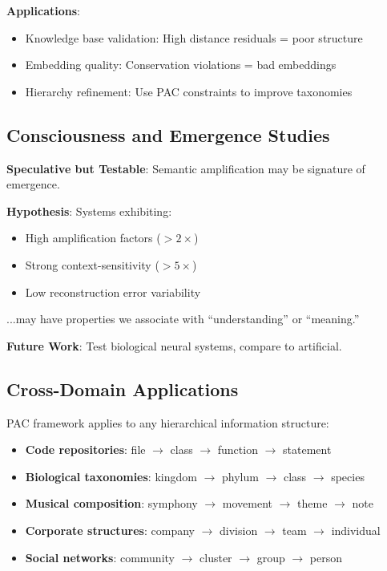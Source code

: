 \documentclass[11pt,a4paper]{article}
\begin{document}
\textbf{Applications}:
\begin{itemize}
    \item Knowledge base validation: High distance residuals = poor structure
    \item Embedding quality: Conservation violations = bad embeddings
    \item Hierarchy refinement: Use PAC constraints to improve taxonomies
\end{itemize}

\subsection{Consciousness and Emergence Studies}

\textbf{Speculative but Testable}: Semantic amplification may be signature of emergence.

\textbf{Hypothesis}: Systems exhibiting:
\begin{itemize}
    \item High amplification factors ($>2\times$)
    \item Strong context-sensitivity ($>5\times$)
    \item Low reconstruction error variability
\end{itemize}
...may have properties we associate with ``understanding'' or ``meaning.''

\textbf{Future Work}: Test biological neural systems, compare to artificial.

\subsection{Cross-Domain Applications}

PAC framework applies to any hierarchical information structure:

\begin{itemize}
    \item \textbf{Code repositories}: file $\to$ class $\to$ function $\to$ statement
    \item \textbf{Biological taxonomies}: kingdom $\to$ phylum $\to$ class $\to$ species
    \item \textbf{Musical composition}: symphony $\to$ movement $\to$ theme $\to$ note
    \item \textbf{Corporate structures}: company $\to$ division $\to$ team $\to$ individual
    \item \textbf{Social networks}: community $\to$ cluster $\to$ group $\to$ person
\end{itemize}
\end{document}
